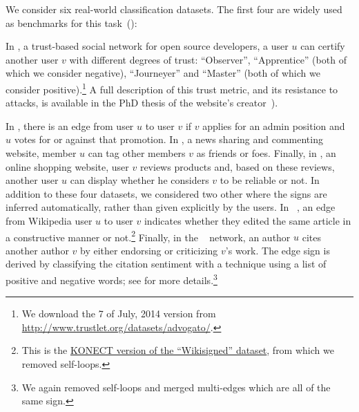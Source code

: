 We consider six real-world classification datasets. The first four are \dssn{} widely
used as benchmarks for this
task~(\eg{}\autocites{Leskovec2010}{shahriari2014ranking}{wu2016troll}{OnlineCompletion17}):
\begin{newcontent}
In \adv{}, a trust-based social network for open source developers, a user $u$ can certify another
user $v$ with different degrees of trust: \enquote{Observer}, \enquote{Apprentice} (both of which we
consider negative), \enquote{Journeyer} and \enquote{Master} (both of which we consider
positive).\footnote{We download the 7\thup{} of July, 2014 version from
\url{http://www.trustlet.org/datasets/advogato/}.} A full description of this trust metric, and its
resistance to attacks, is available in the PhD thesis of the website's creator~\autocite[Section
4]{AdvogatoTrustThesis02}).
\end{newcontent}
In \wik{}, there is an edge from user $u$ to user $v$ if $v$ applies for an admin position and $u$
votes for or against that promotion. In \sla{}, a news sharing and commenting website, member $u$
can tag other members $v$ as friends or foes. Finally, in \epi{}, an online shopping website, user
$v$ reviews products and, based on these reviews, another user $u$ can display whether he considers
$v$ to be reliable or not. In addition to these four datasets, we considered two other \ssn{} where
the signs are inferred automatically, rather than given explicitly by the users.  In
\kiw{}~\cite{wikiedits11}, an edge from Wikipedia user $u$ to user $v$ indicates whether they edited
the same article in a constructive manner or not.\footnote{This is the
\href{http://konect.uni-koblenz.de/networks/wikisigned-k2}{KONECT version of the
\enquote{Wikisigned} dataset}, from which we removed self-loops.} Finally, in the
\aut{}~\cite{kumar2016structure} network, an author $u$ cites another author $v$ by either endorsing
or criticizing $v$'s work. The edge sign is derived by classifying the citation sentiment with a
technique using a list of positive and negative words; see
\cite{kumar2016structure} for more details.\footnote{We again removed self-loops and merged
multi-edges which are all of the same sign.}

